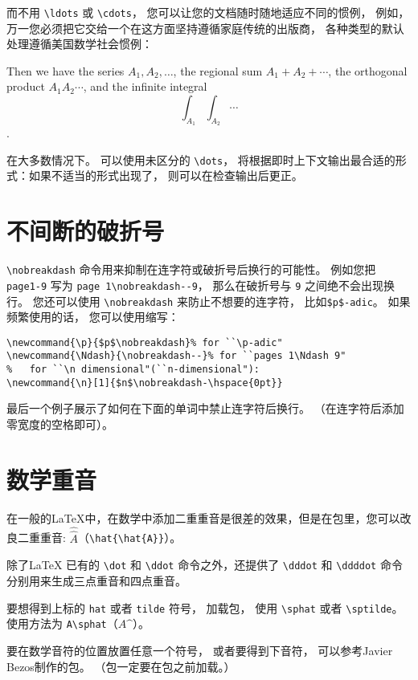 而不用 \verb|\ldots| 或 \verb|\cdots|，  您可以让您的文档随时随地适应不同的惯例，  例如，  万一您必须把它交给一个在这方面坚持遵循家庭传统的出版商，  各种类型的默认处理遵循美国数学社会惯例：

\begin{tcblisting}{}
Then we have the series $A_1,A_2,\dotsc$,
the regional sum $A_1+A_2+\dotsb$, the
orthogonal product $A_1 A_2\dotsm$, and
the infinite integral
\[\int_{A_1}\int_{A_2}\dotsi\].
\end{tcblisting}

在大多数情况下。 可以使用未区分的 \verb|\dots|，  将根据即时上下文输出最合适的形式：如果不适当的形式出现了，  则可以在检查输出后更正。
\section{不间断的破折号}
\verb|\nobreakdash| 命令用来抑制在连字符或破折号后换行的可能性。 例如您把 \verb|page1-9| 写为 \verb|page 1\nobreakdash--9|，  那么在破折号与  \verb|9| 之间绝不会出现换行。 您还可以使用  \verb|\nobreakdash| 来防止不想要的连字符，  比如\verb|$p$-adic|。 如果频繁使用的话，  您可以使用缩写：
\begin{verbatim}
\newcommand{\p}{$p$\nobreakdash}% for ``\p-adic"
\newcommand{\Ndash}{\nobreakdash--}% for ``pages 1\Ndash 9"
%   for ``\n dimensional"(``n-dimensional"):
\newcommand{\n}[1]{$n$\nobreakdash-\hspace{0pt}}
\end{verbatim}

最后一个例子展示了如何在下面的单词中禁止连字符后换行。 （在连字符后添加零宽度的空格即可）。

\section{数学重音}
在一般的\LaTeX 中，在数学中添加二重重音是很差的效果，但是在包里，您可以改良二重重音: $\hat{\hat{A}}$（\verb|\hat{\hat{A}}|）。

除了\LaTeX{} 已有的 \verb|\dot| 和 \verb|\ddot| 命令之外，还提供了 \verb|\dddot| 和 \verb|\ddddot| 命令分别用来生成三点重音和四点重音。

要想得到上标的 \verb|hat| 或者 \verb|tilde| 符号，  加载包，  使用 \verb|\sphat| 或者 \verb|\sptilde|。 使用方法为 \verb|A\sphat|（$A\sphat$）。

要在数学音符的位置放置任意一个符号，  或者要得到下音符，  可以参考Javier Bezos制作的包。 （包一定要在包之前加载。）
